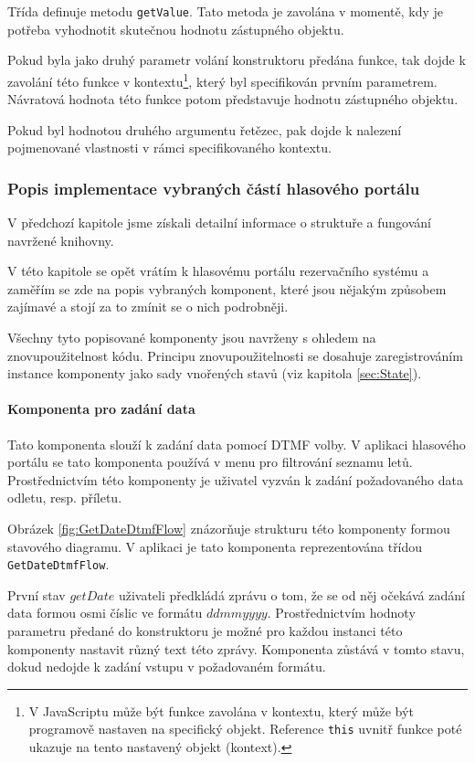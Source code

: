 \documentclass[ing,male,java,dept460,twoside]{diploma}						%
\begin{document}
Třída definuje metodu \texttt{getValue}. Tato metoda je zavolána v momentě, kdy je potřeba vyhodnotit skutečnou hodnotu zástupného objektu.

Pokud byla jako druhý parametr volání konstruktoru předána funkce, tak dojde k zavolání této funkce v kontextu\footnote{V JavaScriptu může být funkce zavolána v kontextu, který může být programově nastaven na specifický objekt. Reference \texttt{this} uvnitř funkce poté ukazuje na tento nastavený objekt (kontext).}, který byl specifikován prvním parametrem. Návratová hodnota této funkce potom představuje hodnotu zástupného objektu.

Pokud byl hodnotou druhého argumentu řetězec, pak dojde k nalezení pojmenované vlastnosti v rámci specifikovaného kontextu.

\subsubsection{Popis implementace vybraných částí hlasového portálu}
V předchozí kapitole jsme získali detailní informace o struktuře a fungování navržené knihovny.

V této kapitole se opět vrátím k hlasovému portálu rezervačního systému a zaměřím se zde na popis vybraných komponent, které jsou nějakým způsobem zajímavé a stojí za to zmínit se o nich podrobněji.

Všechny tyto popisované komponenty jsou navrženy s ohledem na znovupoužitelnost kódu. Principu znovupoužitelnosti se dosahuje zaregistrováním instance komponenty jako sady vnořených stavů (viz kapitola \ref{sec:State}).

\paragraph{Komponenta pro zadání data}
Tato komponenta slouží k zadání data pomocí DTMF volby. V aplikaci hlasového portálu se tato komponenta používá v menu pro filtrování seznamu letů. Prostřednictvím této komponenty je uživatel vyzván k zadání požadovaného data odletu, resp. příletu.

Obrázek \ref{fig:GetDateDtmfFlow} znázorňuje strukturu této komponenty formou stavového diagramu. V aplikaci je tato komponenta reprezentována třídou \texttt{GetDateDtmfFlow}.

První stav $getDate$ uživateli předkládá zprávu o tom, že se od něj očekává zadání data formou osmi číslic ve formátu $ddmmyyyy$. Prostřednictvím hodnoty parametru předané do konstruktoru je možné pro každou instanci této komponenty nastavit různý text této zprávy. Komponenta zůstává v tomto stavu, dokud nedojde k zadání vstupu v požadovaném formátu.
\end{document}
